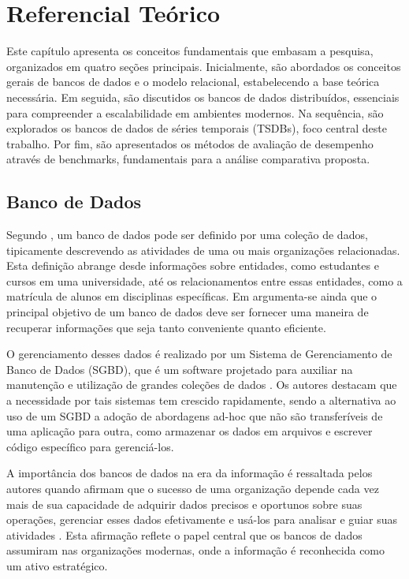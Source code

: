 \chapter{Referencial Teórico}

Este capítulo apresenta os conceitos fundamentais que embasam a pesquisa, organizados em quatro seções principais. Inicialmente, são abordados os conceitos gerais de bancos de dados e o modelo relacional, estabelecendo a base teórica necessária. Em seguida, são discutidos os bancos de dados distribuídos, essenciais para compreender a escalabilidade em ambientes modernos. Na sequência, são explorados os bancos de dados de séries temporais (TSDBs), foco central deste trabalho. Por fim, são apresentados os métodos de avaliação de desempenho através de benchmarks, fundamentais para a análise comparativa proposta.

\section{Banco de Dados}

Segundo , um banco de dados pode ser definido por uma coleção de dados, tipicamente descrevendo as atividades de uma ou mais organizações relacionadas. Esta definição abrange desde informações sobre entidades, como estudantes e cursos em uma universidade, até os relacionamentos entre essas entidades, como a matrícula de alunos em disciplinas específicas. Em  argumenta-se ainda que o principal objetivo de um banco de dados deve ser fornecer uma maneira de recuperar informações que seja tanto conveniente quanto eficiente.

O gerenciamento desses dados é realizado por um Sistema de Gerenciamento de Banco de Dados (SGBD), que é um software projetado para auxiliar na manutenção e utilização de grandes coleções de dados \cite{Ramakrishnan2003}. Os autores destacam que a necessidade por tais sistemas tem crescido rapidamente, sendo a alternativa ao uso de um SGBD a adoção de abordagens ad-hoc que não são transferíveis de uma aplicação para outra, como armazenar os dados em arquivos e escrever código específico para gerenciá-los.

A importância dos bancos de dados na era da informação é ressaltada pelos autores quando afirmam que o sucesso de uma organização depende cada vez mais de sua capacidade de adquirir dados precisos e oportunos sobre suas operações, gerenciar esses dados efetivamente e usá-los para analisar e guiar suas atividades . Esta afirmação reflete o papel central que os bancos de dados assumiram nas organizações modernas, onde a informação é reconhecida como um ativo estratégico.

